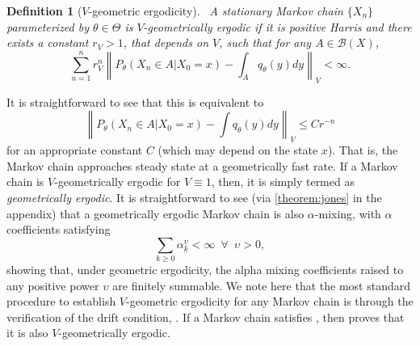 \documentclass[11pt]{amsart}
\newtheorem{defn}{Definition}[section]
\begin{document}
\begin{defn}[{$V$-geometric ergodicity}]~\label{define:v-ergodicity}A stationary Markov chain $\{X_n\}$ parameterized by $\theta \in \Theta$ is $V$-geometrically ergodic if it is positive Harris and there exists a constant $r_V > 1$, that depends on $V$, such that for any $A \in \mathcal B(X)$,
\begin{equation}
    \sum_{n=1}^n r_V^n \left\|P_\theta(X_n \in A | X_0 = x)- \int_A q_\theta(y) dy \right\|_V < \infty.
\end{equation}
\end{defn}
It is straightforward to see that this is equivalent to 
\begin{equation*}
    \left\|P_\theta(X_n \in A |X_0=x)-\int q_\theta(y) dy \right\|_V\leq C r^{-n}
\end{equation*}
for an appropriate constant $C$ (which may depend on the state $x$). That is, the Markov chain approaches steady state at a geometrically fast rate.
If a Markov chain is $V$-geometrically ergodic for $V\equiv1$, then, it is simply termed as \textit{geometrically ergodic}. It is straightforward to see (via \cref{theorem:jones} in the appendix) that a geometrically ergodic Markov chain is also $\alpha$-mixing, with $\alpha$ coefficients satisfying
\begin{equation}\label{eq:alpha_mixing-coeff-sum}
    \sum_{k\geq 0} \alpha_k^{\upsilon}<\infty\enspace\forall\enspace\upsilon>0,
\end{equation}
{showing that, under geometric ergodicity, the alpha mixing coefficients raised to any positive power $\upsilon$ are finitely summable.} We note here that the most standard procedure to establish $V$-geometric ergodicity for any Markov chain is through the verification of the drift condition, . If a Markov chain satisfies , then  proves that it is also $V$-geometrically ergodic. 
\end{document}
